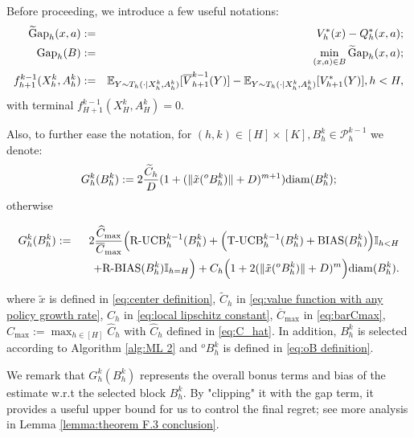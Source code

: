 \documentclass[final,supplement]{siamart251216}
\newcommand{\hCh}{\widehat{C}_h} %
\begin{document}
Before proceeding, we introduce a few useful notations: 
\begin{eqnarray}
     {\rm \widetilde{G}ap}_h(x,a)&:=&V_h^{*}(x)-Q_h^{*}(x,a);\label{eq:gap definition} \\
     {\rm Gap}_h(B)&:=&\min_{(x,a)\in B}{\rm \widetilde{G}ap}_h(x,a);\label{eq:gapB definition}\\
     f_{h+1}^{k-1}(X_h^k, A_h^k)&:=&\mathbb{E}_{Y \sim {T}_{h}(\cdot|X_h^k,A_h^k)}[\overline{V}_{h+1}^{k-1}(Y)]-\mathbb{E}_{Y \sim {T}_{h}(\cdot|X_h^k,A_h^k)}[V_{h+1}^{*}(Y)],h<H\label{eq:f definition},
\end{eqnarray}
with terminal $f_{H+1}^{k-1}(X_H^k,A_H^k)=0$.


Also, to further ease the notation, for $(h,k)\in [H]\times[K], B_h^k \in \mathcal{P}_h^{k-1}$ we denote:
$$G_h^{k}(B_h^k):=2\frac{\widetilde{C}_h}{D}(1+(\|\tilde{x}(^{o}B_h^k)\|+D)^{m+1}){\rm diam}(B_h^k);$$
otherwise 

\begin{eqnarray}\label{eq:G_h^k definition}
G_h^{k}(B_h^k)
&:=&
2\frac{\widehat{C}_{\max}}{\overline{C}_{\max}}
\Big(
\mbox{\rm R-UCB}_{h}^{k-1}(B_h^k)
+
\Big(
\mbox{\rm T-UCB}_{h}^{k-1}(B_h^k)
+
{\rm BIAS}(B_h^k)
\Big)\mathbb{I}_{h<H}
\\
&&\quad+
\mbox{\rm R-BIAS}(B_h^k)\mathbb{I}_{h=H}
\Big)+
C_h\Big(
1+2(\|\tilde{x}(^{o}B_h^k)\|+D)^m
\Big){\rm diam}(B_h^k).
\nonumber
\end{eqnarray}

where $\tilde{x}$ is defined in \eqref{eq:center definition}, $\widetilde{C}_h$  in \eqref{eq:value function with any policy growth rate}, $C_h$  in \eqref{eq:local lipschitz constant}, $\overline{C}_{\max}$  in \eqref{eq:barCmax}, $\widehat{C}_{\max}:=\max_{h\in[H]}\hCh$ with $\hCh$ defined in \eqref{eq:C_hat}. In addition, $B_h^k$ is selected according to Algorithm \ref{alg:ML 2} and $^{o}B_h^k$ is defined in \eqref{eq:oB definition}.

\begin{remark}[Role of $G_h^k(B_h^k)$] 
We remark that $G_h^k(B_h^k)$ represents the overall bonus terms and bias of the estimate w.r.t the selected block $B_h^k$. By "clipping" it with the gap term, it provides a useful upper bound for us to control the final regret; see more analysis in Lemma \ref{lemma:theorem F.3 conclusion}.
\end{remark}
\end{document}
